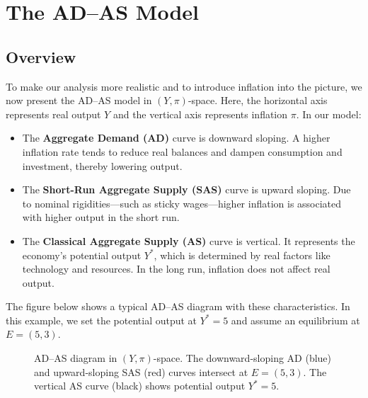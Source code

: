 \chapter*{The AD--AS Model}
\section*{Overview}
To make our analysis more realistic and to introduce inflation into the picture, we now present the AD--AS model in \((Y,\pi)\)-space. Here, the horizontal axis represents real output \(Y\) and the vertical axis represents inflation \(\pi\). In our model:
\begin{itemize}
    \item The \textbf{Aggregate Demand (AD)} curve is downward sloping. A higher inflation rate tends to reduce real balances and dampen consumption and investment, thereby lowering output.
    \item The \textbf{Short-Run Aggregate Supply (SAS)} curve is upward sloping. Due to nominal rigidities—such as sticky wages—higher inflation is associated with higher output in the short run.
    \item The \textbf{Classical Aggregate Supply (AS)} curve is vertical. It represents the economy's potential output \(Y^*\), which is determined by real factors like technology and resources. In the long run, inflation does not affect real output.
\end{itemize}
The figure below shows a typical AD--AS diagram with these characteristics. In this example, we set the potential output at \(Y^*=5\) and assume an equilibrium at \(E=(5,3)\).
\begin{figure}[ht]
    \centering
    \caption{AD--AS diagram in \((Y,\pi)\)-space. The downward-sloping AD (blue) and upward-sloping SAS (red) curves intersect at \(E=(5,3)\). The vertical AS curve (black) shows potential output \(Y^*=5\).}
\end{figure}

